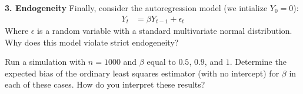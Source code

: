 \documentclass[12pt]{article}
\begin{document}
{\bf 3. Endogeneity} Finally, consider the autoregression model (we
intialize $Y_0 = 0$):
\begin{align}
Y_t &= \beta Y_{t-1} + \epsilon_t
\end{align}
Where $\epsilon$ is a random variable with a standard multivariate normal
distribution. Why does this model violate strict endogeneity?

Run a simulation with $n=1000$ and $\beta$ equal to $0.5$, $0.9$, and $1$.
Determine the expected bias of the ordinary least squares estimator
(with no intercept) for $\beta$ in each of these cases.
How do you interpret these results?
\end{document}
